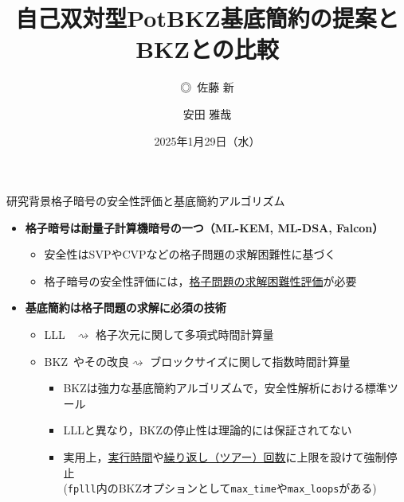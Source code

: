 \documentclass[12pt,aspectratio=169,xcolor=dvipsnames,table,dvipdfmx, leqno]{beamer}
\title[自己双対型PotBKZの提案とBKZとの比較]{ 自己双対型PotBKZ基底簡約の提案とBKZとの比較}
\author[◎~佐藤, 安田]{◎~佐藤 新\inst{1}\and 安田 雅哉\inst{1}}
\date{2025年1月29日（水）}
\institute[]{\inst{1}~立教大学}
\begin{document}
\maketitle

\begin{frame}{研究背景}{格子暗号の安全性評価と基底簡約アルゴリズム}
\begin{itemize}
    \item \textbf{格子暗号は耐量子計算機暗号の一つ（ML-KEM, ML-DSA, Falcon）}
    \begin{itemize}
        \item 安全性はSVPやCVPなどの格子問題の求解困難性に基づく
        \item 格子暗号の安全性評価には，\uline{格子問題の求解困難性評価}が必要
    \end{itemize}
    \item \textbf{基底簡約は格子問題の求解に必須の技術}
    \begin{itemize}
        \item LLL~\cite{LLL82} $\rightsquigarrow$ 格子次元に関して多項式時間計算量
        \item BKZ~\cite{SE94}やその改良$\rightsquigarrow$ ブロックサイズに関して指数時間計算量 \\
        \begin{itemize}
            \item BKZは強力な基底簡約アルゴリズムで，安全性解析における標準ツール
            \item LLLと異なり，BKZの停止性は理論的には保証されてない
            \item 実用上，\uline{実行時間}や\uline{繰り返し（ツアー）回数}に上限を設けて\alert{強制停止} \\
            (\texttt{fplll}\cite{fpylll}内のBKZオプションとして\texttt{max\_time}や\texttt{max\_loops}がある)
        \end{itemize}
    \end{itemize}
\end{itemize}
\end{frame}
\end{document}

